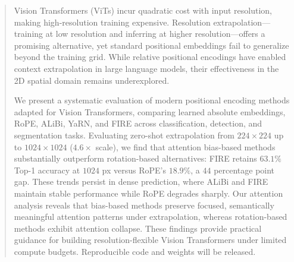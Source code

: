 \begin{abstract}
Vision Transformers (ViTs) incur quadratic cost with input resolution, making high-resolution training expensive. Resolution extrapolation---training at low resolution and inferring at higher resolution---offers a promising alternative, yet standard positional embeddings fail to generalize beyond the training grid. While relative positional encodings have enabled context extrapolation in large language models, their effectiveness in the 2D spatial domain remains underexplored.

We present a systematic evaluation of modern positional encoding methods adapted for Vision Transformers, comparing learned absolute embeddings, RoPE, ALiBi, YaRN, and FIRE across classification, detection, and segmentation tasks. Evaluating zero-shot extrapolation from $224 \times 224$ up to $1024 \times 1024$ ($4.6\times$ scale), we find that attention bias-based methods substantially outperform rotation-based alternatives: FIRE retains $63.1\%$ Top-1 accuracy at $1024$ px versus RoPE's $18.9\%$, a $44$ percentage point gap. These trends persist in dense prediction, where ALiBi and FIRE maintain stable performance while RoPE degrades sharply. Our attention analysis reveals that bias-based methods preserve focused, semantically meaningful attention patterns under extrapolation, whereas rotation-based methods exhibit attention collapse. These findings provide practical guidance for building resolution-flexible Vision Transformers under limited compute budgets. Reproducible code and weights will be released.
\end{abstract}